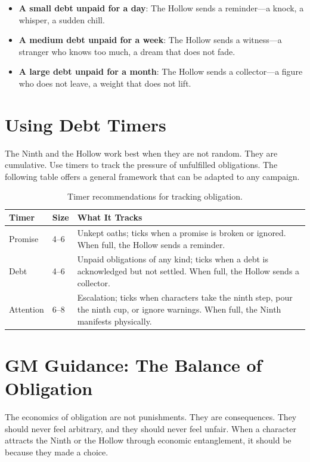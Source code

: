 \documentclass[11pt,letterpaper,twoside]{book}
\begin{document}
\begin{itemize}
\item \textbf{A small debt unpaid for a day}: The Hollow sends a reminder---a knock, a whisper, a sudden chill.
\item \textbf{A medium debt unpaid for a week}: The Hollow sends a witness---a stranger who knows too much, a dream that does not fade.
\item \textbf{A large debt unpaid for a month}: The Hollow sends a collector---a figure who does not leave, a weight that does not lift.
\end{itemize}

\section{Using Debt Timers}

The Ninth and the Hollow work best when they are not random. They are cumulative. Use timers to track the pressure of unfulfilled obligations. The following table offers a general framework that can be adapted to any campaign.

\begin{table}[h]
\centering
\begin{tabular}{|p{3cm}|p{2cm}|p{5cm}|}
\hline
\textbf{Timer} & \textbf{Size} & \textbf{What It Tracks} \\
\hline
Promise & 4--6 & Unkept oaths; ticks when a promise is broken or ignored. When full, the Hollow sends a reminder. \\
Debt & 4--6 & Unpaid obligations of any kind; ticks when a debt is acknowledged but not settled. When full, the Hollow sends a collector. \\
Attention & 6--8 & Escalation; ticks when characters take the ninth step, pour the ninth cup, or ignore warnings. When full, the Ninth manifests physically. \\
\hline
\end{tabular}
\caption{Timer recommendations for tracking obligation.}
\end{table}

\section{GM Guidance: The Balance of Obligation}

The economics of obligation are not punishments. They are consequences. They should never feel arbitrary, and they should never feel unfair. When a character attracts the Ninth or the Hollow through economic entanglement, it should be because they made a choice.
\end{document}
